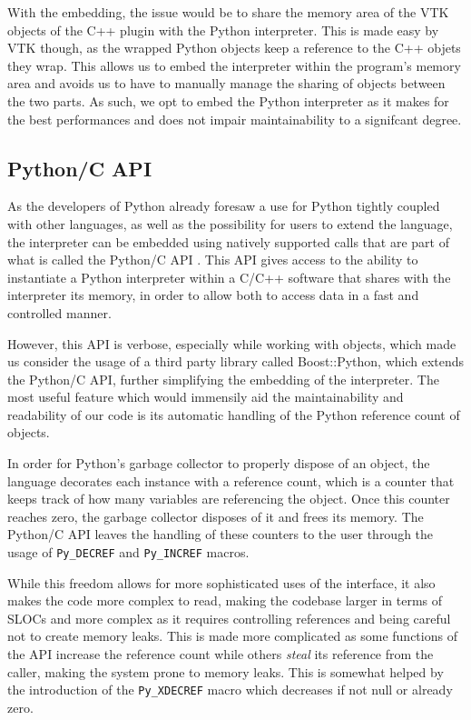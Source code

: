 With the embedding, the issue would be to share the memory area of the VTK objects of the C++ plugin with the Python interpreter. This is made easy by VTK though, as the wrapped Python objects keep a reference to the C++ objets they wrap. This allows us to embed the interpreter within the program's memory area and avoids us to have to manually manage the sharing of objects between the two parts. As such, we opt to embed the Python interpreter as it makes for the best performances and does not impair maintainability to a signifcant degree.

\subsection{Python/C API}

As the developers of Python already foresaw a use for Python tightly coupled with other languages, as well as the possibility for users to extend the language, the interpreter can be embedded using natively supported calls that are part of what is called the Python/C API \cite{python_c_api}. This API gives access to the ability to instantiate a Python interpreter within a C/C++ software that shares with the interpreter its memory, in order to allow both to access data in a fast and controlled manner.

However, this API is verbose, especially while working with objects, which made us consider the usage of a third party library called Boost::Python, which extends the Python/C API, further simplifying the embedding of the interpreter. The most useful feature which would immensily aid the maintainability and readability of our code is its automatic handling of the Python reference count of objects.

In order for Python's garbage collector to properly dispose of an object, the language decorates each instance with a reference count, which is a counter that keeps track of how many variables are referencing the object. Once this counter reaches zero, the garbage collector disposes of it and frees its memory. The Python/C API leaves the handling of these counters to the user through the usage of \verb|Py_DECREF| and \verb|Py_INCREF| macros.

While this freedom allows for more sophisticated uses of the interface, it also makes the code more complex to read, making the codebase larger in terms of SLOCs and more complex as it requires controlling references and being careful not to create memory leaks. This is made more complicated as some functions of the API increase the reference count while others \textit{steal} its reference from the caller, making the system prone to memory leaks. This is somewhat helped by the introduction of the \verb|Py_XDECREF| macro which decreases if not null or already zero.


